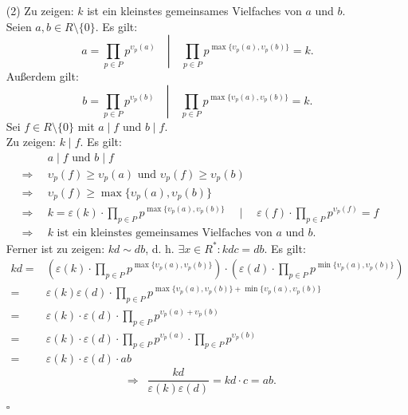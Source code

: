 \documentclass[12pt]{article}
\newcommand{\QED}{\begin{flushright} $\square$ \end{flushright}}
\newcommand{\df}{\enspace\Longrightarrow\enspace}
\begin{document}
\begin{enumerate}
\begin{enumerate}
		\item[(2)] Zu zeigen: $k$ ist ein kleinstes gemeinsames Vielfaches von $a$ und $b$. \\
		Seien $a,b\in R\setminus\{0\}$. Es gilt:
		$$a=\left.\prod_{p\in P}p^{\upsilon_p(a)} \quad\right\vert\quad \prod_{p\in P}p^{\max\{\upsilon_p(a),\upsilon_p(b)\}} = k.$$
		Außerdem gilt:
		$$b=\left.\prod_{p\in P}p^{\upsilon_p(b)} \quad\right\vert\quad \prod_{p\in P}p^{\max\{\upsilon_p(a),\upsilon_p(b)\}} = k.$$
		Sei $f\in R\setminus\{0\}$ mit $a\mid f$ und $b\mid f$. \\
		Zu zeigen: $k\mid f$. Es gilt: 
		\begin{align*}
			&a\mid f\text{ und }b\mid f \\
			\df &\upsilon_p(f)\geq\upsilon_p(a)\text{ und }\upsilon_p(f)\geq\upsilon_p(b) \\
			\df &\upsilon_p(f)\geq\max\{\upsilon_p(a),\upsilon_p(b)\} \\
			\df &k=\varepsilon(k)\cdot\prod_{p\in P}p^{\max\{\upsilon_p(a),\upsilon_p(b)\}} \quad\mid\quad \varepsilon(f)\cdot\prod_{p\in P}p^{\upsilon_p(f)}=f \\
			\df &k\text{ ist ein kleinstes gemeinsames Vielfaches von $a$ und $b$}.
		\end{align*}
		Ferner ist zu zeigen: $kd\sim db$, d. h. $\exists x\in R^*:kdc=db$. Es gilt:
		\begin{align*}
			kd =& \left(\varepsilon(k)\cdot\prod_{p\in P}p^{\max\{\upsilon_p(a),\upsilon_p(b)\}}\right)\cdot\left(\varepsilon(d)\cdot\prod_{p\in P}p^{\min\{\upsilon_p(a),\upsilon_p(b)\}}\right) \\
			=& \varepsilon(k)\varepsilon(d)\cdot\prod_{p\in P}p^{\max\{\upsilon_p(a),\upsilon_p(b)\}+\min\{\upsilon_p(a),\upsilon_p(b)\}} \\
			=& \varepsilon(k)\cdot\varepsilon(d)\cdot\prod_{p\in P}p^{\upsilon_p(a)+\upsilon_p(b)} \\
			=& \varepsilon(k)\cdot\varepsilon(d)\cdot\prod_{p\in P}p^{\upsilon_p(a)}\cdot\prod_{p\in P}p^{\upsilon_p(b)} \\
			=& \varepsilon(k)\cdot\varepsilon(d)\cdot ab
		\end{align*}
		$$\df \frac{kd}{\varepsilon(k)\varepsilon(d)}=kd\cdot c=ab.$$
		\QED
	\end{enumerate}
\end{enumerate}
\end{document}

